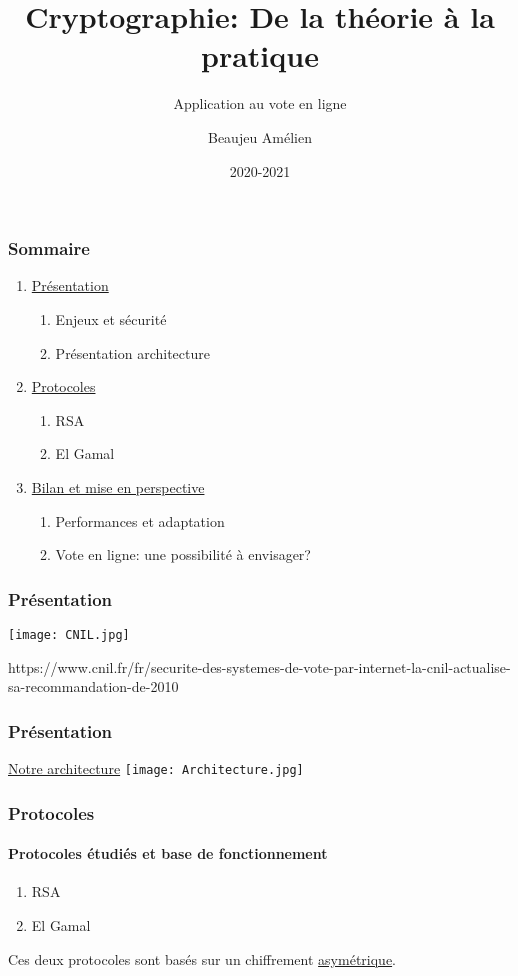\documentclass[10pt]{beamer}
\title{Cryptographie: De la théorie à la pratique}
\subtitle{Application au vote en ligne}
\author[Beaujeu Amélien]{Beaujeu Amélien}
\date{2020-2021}
\institute[UT3 -- FSI]{MPX-Lycée Blaise Pascal}
\begin{document}
\frame{\titlepage}

\begin{frame}
\frametitle{Sommaire}
\begin{enumerate}
\item \underline{Présentation}
\begin{enumerate}
\item Enjeux et sécurité
\item Présentation architecture
\end{enumerate}
\item \underline{Protocoles}
\begin{enumerate}
\item RSA
\item El Gamal
\end{enumerate}
\item \underline{Bilan et mise en perspective}
\begin{enumerate}
\item Performances et adaptation
\item Vote en ligne: une possibilité à envisager?
\end{enumerate}
\end{enumerate}
\end{frame}

\begin{frame}
\frametitle{Présentation}
\begin{center}
\texttt{[image: CNIL.jpg]}
\end{center}
https://www.cnil.fr/fr/securite-des-systemes-de-vote-par-internet-la-cnil-actualise-sa-recommandation-de-2010
\end{frame}

\begin{frame}
\frametitle{Présentation}
\begin{center}
\underline{Notre architecture}
\texttt{[image: Architecture.jpg]}
\end{center}
\end{frame}

\begin{frame}
\frametitle{Protocoles}
\framesubtitle{Protocoles étudiés et base de fonctionnement}
\begin{enumerate}
\item RSA
\item El Gamal
\end{enumerate}
Ces deux protocoles sont basés sur un chiffrement \underline{asymétrique}.
\end{frame}
\end{document}
